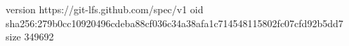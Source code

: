 version https://git-lfs.github.com/spec/v1
oid sha256:279b0cc10920496cdeba88cf036c34a38afa1c714548115802fc07cfd92b5dd7
size 349692
